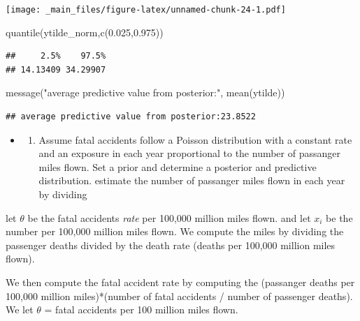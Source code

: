 \documentclass[
]{book}
\newenvironment{Shaded}{\begin{snugshade}}{\end{snugshade}}
\newcommand{\FloatTok}[1]{\textcolor[rgb]{0.00,0.00,0.81}{#1}}
\newcommand{\FunctionTok}[1]{\textcolor[rgb]{0.00,0.00,0.00}{#1}}
\newcommand{\NormalTok}[1]{#1}
\newcommand{\StringTok}[1]{\textcolor[rgb]{0.31,0.60,0.02}{#1}}
\providecommand{\tightlist}{%
  \setlength{\itemsep}{0pt}\setlength{\parskip}{0pt}}
\theoremstyle{definition}
\theoremstyle{definition}
\theoremstyle{definition}
\theoremstyle{definition}
\theoremstyle{remark}
\begin{document}
\texttt{[image: \_main\_files/figure-latex/unnamed-chunk-24-1.pdf]}

\begin{Shaded}
\begin{Highlighting}[]
 \FunctionTok{quantile}\NormalTok{(ytilde\_norm,}\FunctionTok{c}\NormalTok{(}\FloatTok{0.025}\NormalTok{,}\FloatTok{0.975}\NormalTok{))}
\end{Highlighting}
\end{Shaded}

\begin{verbatim}
##     2.5%    97.5% 
## 14.13409 34.29907
\end{verbatim}

\begin{Shaded}
\begin{Highlighting}[]
 \FunctionTok{message}\NormalTok{(}\StringTok{"average predictive value from posterior:"}\NormalTok{, }\FunctionTok{mean}\NormalTok{(ytilde))}
\end{Highlighting}
\end{Shaded}

\begin{verbatim}
## average predictive value from posterior:23.8522
\end{verbatim}

\begin{itemize}
\item
  \begin{enumerate}
  \def\labelenumi{(\alph{enumi})}
  \setcounter{enumi}{1}
  \tightlist
  \item
    Assume fatal accidents follow a Poisson distribution with a constant rate and an exposure in each year proportional to the number of passanger miles flown. Set a prior and determine a posterior and predictive distribution. estimate the number of passanger miles flown in each year by dividing
  \end{enumerate}
\end{itemize}

let \(\theta\) be the fatal accidents \emph{rate} per 100,000 million miles flown. and let \(x_i\) be the number per 100,000 million miles flown. We compute the miles by dividing the passenger deaths divided by the death rate (deaths per 100,000 million miles flown).

We then compute the fatal accident rate by computing the (passanger deaths per 100,000 million miles)*(number of fatal accidents / number of passenger deaths). We let \(\theta\) = fatal accidents per 100 million miles flown.
\end{document}
